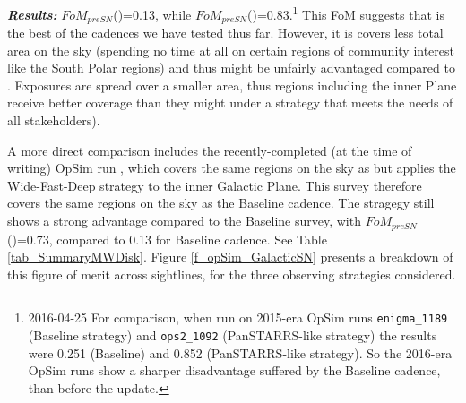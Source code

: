 {\it \bf Results:} $FoM_{preSN}$()=0.13,
while
$FoM_{preSN}$()=0.83.\footnote{2016-04-25 For
  comparison, when run on 2015-era OpSim runs {\tt enigma\_1189}
  (Baseline strategy) and {\tt ops2\_1092} (PanSTARRS-like strategy)
  the results were 0.251 (Baseline) and 0.852 (PanSTARRS-like
  strategy). So the 2016-era OpSim runs show a sharper disadvantage
  suffered by the Baseline cadence, than before the update.} This FoM
suggests that  is the best of the cadences we
have tested thus far. However, it is covers less total area on the sky
(spending no time at all on certain regions of community interest like
the South Polar regions) and thus might be unfairly advantaged
compared to . Exposures are spread over a
smaller area, thus regions including the inner Plane receive better
coverage than they might under a strategy that meets the needs of all
stakeholders).

A more direct comparison includes the recently-completed (at the time
of writing) OpSim run , which
covers the same regions on the sky as  but
applies the Wide-Fast-Deep strategy to the inner Galactic Plane. This
survey therefore covers the same regions on the sky as the Baseline
cadence. The stragegy  still shows
a strong advantage compared to the Baseline survey, with
$FoM_{preSN}$()=0.73, compared to
0.13 for Baseline cadence. See Table \ref{tab_SummaryMWDisk}. Figure
\ref{f_opSim_GalacticSN} presents a breakdown of this figure of merit
across sightlines, for the three observing strategies considered.


